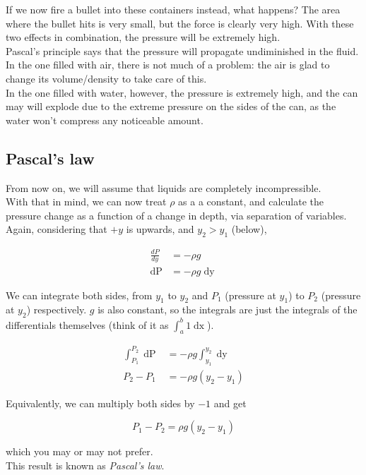 If we now fire a bullet into these containers instead, what happens? The area where the bullet hits is very small, but the force is clearly very high. With these two effects in combination, the pressure will be extremely high.\\
Pascal's principle says that the pressure will propagate undiminished in the fluid.\\
In the one filled with air, there is not much of a problem: the air is glad to change its volume/density to take care of this.\\
In the one filled with water, however, the pressure is extremely high, and the can may will explode due to the extreme pressure on the sides of the can, as the water won't compress any noticeable amount.

\subsection{Pascal's law}

From now on, we will assume that liquids are completely incompressible.\\
With that in mind, we can now treat $\rho$ as a a constant, and calculate the pressure change as a function of a change in depth, via separation of variables. Again, considering that $+y$ is upwards, and $y_2 > y_1$ (below),

\begin{align}
\frac{dP}{dy} &= - \rho g\\
\mathop{dP} &= - \rho g \mathop{dy}
\end{align}

We can integrate both sides, from $y_1$ to $y_2$ and $P_1$ (pressure at $y_1$) to $P_2$ (pressure at $y_2$) respectively. $g$ is also constant, so the integrals are just the integrals of the differentials themselves (think of it as $\int_a^b 1 \mathop{dx}$).

\begin{align}
\int_{P_1}^{P_2} \mathop{dP} &= - \rho g \int_{y_1}^{y_2}\mathop{dy}\\
P_2 - P_1 &= -\rho g(y_2 - y_1)
\end{align}

Equivalently, we can multiply both sides by $-1$ and get

\begin{equation}
P_1 - P_2 = \rho g(y_2 - y_1)
\end{equation}

which you may or may not prefer.\\
This result is known as \emph{Pascal's law}.

